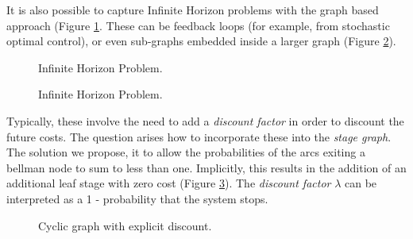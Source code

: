 \documentclass[final,1p,times]{elsarticle}
\newcommand{\drawDHsquiggle}[1]{\draw[-stealth, decoration={snake, amplitude = .4mm, segment length = 1.5mm, post length=0.9mm},decorate] (#1)+(0.75, 0.5) -- (#1);}
\begin{document}
It is also possible to capture Infinite Horizon problems with the graph based approach (Figure \ref{fig:cycle}. These can be feedback loops (for example, from stochastic optimal control), or even sub-graphs embedded inside a larger graph (Figure \ref{fig:extcycle}).

\begin{figure}[!ht]
    \centering
{}
\caption{Infinite Horizon Problem.}
\label{fig:cycle}
\end{figure}

\begin{figure}[!ht]
    \centering
{}
\caption{Infinite Horizon Problem.}
\label{fig:extcycle}
\end{figure}

Typically, these involve the need to add a \emph{discount factor} in order to discount the future costs. The question arises how to incorporate these into the \emph{stage graph}. The solution we propose, it to allow the probabilities of the arcs exiting a bellman node to sum to less than one. Implicitly, this results in the addition of an additional leaf stage with zero cost (Figure \ref{fig:discount}). The \emph{discount factor} $\lambda$ can be interpreted as a 1 - probability that the system stops. 

\begin{figure}[!ht]
    \centering
{}
\caption{Cyclic graph with explicit discount.}
\label{fig:discount}
\end{figure}
\end{document}
